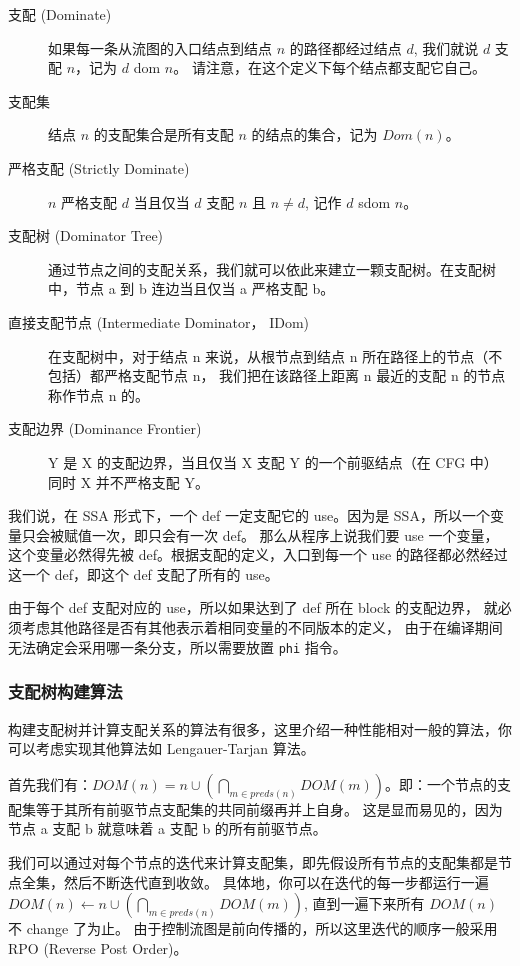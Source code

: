 \begin{description}
    \item[支配 (Dominate)]
    如果每一条从流图的入口结点到结点 $n$ 的路径都经过结点 $d$, 我们就说 $d$ 支配 $n$，记为 $d$ dom $n$。
    请注意，在这个定义下每个结点都支配它自己。
    \item[支配集]
    结点 $n$ 的支配集合是所有支配 $n$ 的结点的集合，记为 $Dom(n)$。
    \item[严格支配 (Strictly Dominate)]
    $n$ 严格支配 $d$ 当且仅当 $d$ 支配 $n$ 且 $n\neq d$, 记作 $d$ sdom $n$。
       
    \item[支配树 (Dominator Tree)]
    通过节点之间的支配关系，我们就可以依此来建立一颗支配树。在支配树中，节点 a 到 b 连边当且仅当 a 严格支配 b。

    \item[直接支配节点 (Intermediate Dominator， IDom)]
    在支配树中，对于结点 n 来说，从根节点到结点 n 所在路径上的节点（不包括）都严格支配节点 n，
    我们把在该路径上距离 n 最近的支配 n 的节点称作节点 n 的。
    \item[支配边界 (Dominance Frontier)]
    Y 是 X 的支配边界，当且仅当 X 支配 Y 的一个前驱结点（在 CFG 中）
    同时 X 并不严格支配 Y。
\end{description}

我们说，在 SSA 形式下，一个 def 一定支配它的 use。因为是 SSA，所以一个变量只会被赋值一次，即只会有一次 def。
那么从程序上说我们要 use 一个变量，这个变量必然得先被 def。根据支配的定义，入口到每一个
use 的路径都必然经过这一个 def，即这个 def 支配了所有的 use。

由于每个 def 支配对应的 use，所以如果达到了 def 所在 block 的支配边界，
就必须考虑其他路径是否有其他表示着相同变量的不同版本的定义，
由于在编译期间无法确定会采用哪一条分支，所以需要放置 \texttt{phi} 指令。

\subsubsection{支配树构建算法}

构建支配树并计算支配关系的算法有很多，这里介绍一种性能相对一般的算法，你可以考虑实现其他算法如 Lengauer-Tarjan
算法。

首先我们有：$DOM(n)={n}\cup(\bigcap_{m\in preds(n)}DOM(m))$。即：一个节点的支配集等于其所有前驱节点支配集的共同前缀再并上自身。
这是显而易见的，因为节点 a 支配 b 就意味着 a 支配 b 的所有前驱节点。

我们可以通过对每个节点的迭代来计算支配集，即先假设所有节点的支配集都是节点全集，然后不断迭代直到收敛。
具体地，你可以在迭代的每一步都运行一遍 $DOM(n)\leftarrow{n}\cup(\bigcap_{m\in preds(n)}DOM(m))$,
直到一遍下来所有 $DOM(n)$ 不 change 了为止。
由于控制流图是前向传播的，所以这里迭代的顺序一般采用 RPO (Reverse Post Order)。

